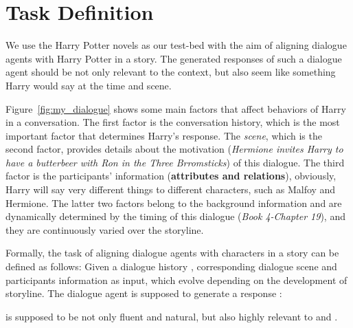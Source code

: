 \documentclass[11pt]{article}
\begin{document}
%
 



\section{Task Definition}
\label{task_definition}

We use the Harry Potter novels as our test-bed with the aim of aligning dialogue agents with Harry Potter in a story.
The generated responses of such a dialogue agent should be not only relevant to the context, but also seem like something Harry would say at the time and scene.



Figure~\ref{fig:my_dialogue} shows some main factors that affect behaviors of Harry in a conversation.  The first factor is the conversation history, which is the most important factor that determines Harry's response. 
The \textit{scene}, which is the second factor, provides details about the motivation (\textit{Hermione invites Harry to have a butterbeer with Ron in the Three Brromsticks}) of this dialogue. 
The third factor is the participants' information (\textbf{attributes and relations}), obviously, Harry will say very different things to different characters, such as Malfoy and Hermione.
The latter two factors belong to the background information and are dynamically determined by the timing of this dialogue (\textit{Book 4-Chapter 19}), and they are continuously varied over the storyline. 






Formally, the task of aligning dialogue agents with characters in a story can be defined as follows: Given a dialogue history ,  corresponding dialogue scene  and participants information  as input, which evolve depending on the development of storyline.
The dialogue agent  is supposed to generate a  response :


 is supposed   to be not only fluent and natural, but also  highly relevant to  and .

















 
\end{document}
